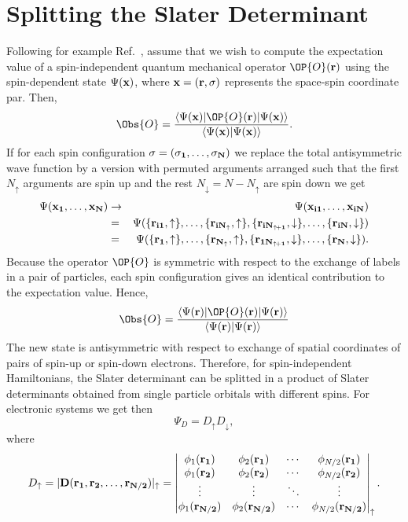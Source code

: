 \section{Splitting the Slater Determinant}
Following for example Ref.~\cite{needs1996}, assume that we wish to compute the expectation value of a spin-independent quantum mechanical operator $\OP{O}({\bf r})$ using the spin-dependent state $\Psi({\bf x})$, where ${\bf x} = ({\bf r}, {\bf \sigma})$ represents the space-spin coordinate par. Then,
$$
\Obs{O} = \frac{\langle\Psi({\bf x})|\OP{O}({\bf r})|\Psi({\bf x})\rangle}{\langle\Psi({\bf x})|\Psi({\bf x})\rangle}.
$$
If for each spin configuration ${\bf \sigma} = ({\bf \sigma_1}, \ldots, {\bf \sigma_N})$ we replace the total antisymmetric wave function by a version with permuted arguments arranged such that the first $N_{\uparrow}$ arguments are spin up and the rest $N_{\downarrow} = N - N_{\uparrow}$ are spin down we get
\begin{eqnarray*}
 \Psi({\bf x_1},\ldots,{\bf x_N}) & \rightarrow & \Psi({\bf x_{i1}},\ldots,{\bf x_{iN}})\\
				  &    =        & \Psi(\{{\bf r_{i1}},\uparrow\},\ldots,\{{\bf r_{iN_{\uparrow}}}, \uparrow\},              		\{{\bf r_{iN_{\uparrow\!+1}}},\downarrow\},\ldots,\{{\bf r_{iN}}, \downarrow\})\\
				  &    =        & \Psi(\{{\bf r_{1}},\uparrow\},\ldots,\{{\bf r_{N_{\uparrow}}}, \uparrow\},              		\{{\bf r_{1N_{\uparrow\!+ 1}}},\downarrow\},\ldots,\{{\bf r_{N}}, \downarrow\}).
\end{eqnarray*}
Because the operator $\OP{O}$ is symmetric with respect to the exchange of labels in a pair of particles, each spin configuration gives an identical contribution to the expectation value. Hence, 
$$
\Obs{O} = \frac{\langle\Psi({\bf r})|\OP{O}({\bf r})|\Psi({\bf r})\rangle}{\langle\Psi({\bf r})|\Psi({\bf r})\rangle}
$$
The new state is antisymmetric with respect to exchange of spatial coordinates of pairs of spin-up or spin-down electrons. Therefore, for spin-independent Hamiltonians, the Slater determinant can be splitted in a product of Slater determinants obtained from single particle orbitals with different spins. For electronic systems we get then
$$
\Psi_D = D_\uparrow D_\downarrow,
$$
where 
\begin{equation}
D_\uparrow = |{\bf D}({\bf r_1}, {\bf r_2},\ldots,{\bf r_{N/2}})|_{\uparrow} = 
 \begin{vmatrix}
 \phi_1({\bf r_1}) & \phi_2({\bf r_1}) & \cdots & \phi_{N/2}({\bf r_1})\\
\phi_1({\bf r_2}) & \phi_2({\bf r_2}) & \cdots & \phi_{N/2}({\bf r_2})\\
\vdots  & \vdots & \ddots & \vdots  \\
\phi_1({\bf r_{N/2}}) & \phi_2({\bf r_{N/2}}) & \cdots & \phi_{N/2}({\bf r_{N/2}})  
 \end{vmatrix}_{\uparrow}.
\end{equation}
